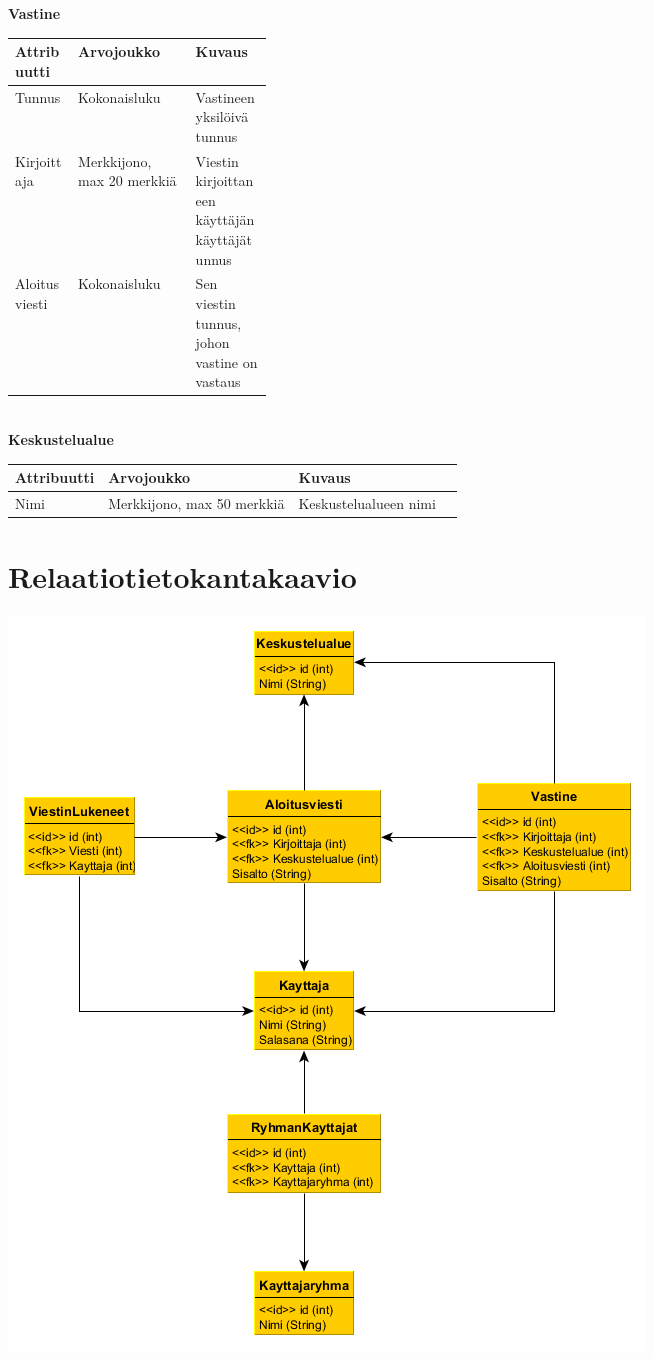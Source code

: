 \documentclass[12pt,a4paper,leqno]{report}
\begin{document}
\noindent \textbf{Vastine}

\begin{center}
\begin{tabular}{| l | l |m{0.3\linewidth}|}
\hline
\textbf{Attribuutti} & \textbf{Arvojoukko} & \textbf{Kuvaus} \\ \hline
Tunnus & Kokonaisluku & Vastineen yksilöivä tunnus \\ \hline
Kirjoittaja & Merkkijono, max 20 merkkiä & Viestin kirjoittaneen käyttäjän käyttäjätunnus \\ \hline
Aloitusviesti & Kokonaisluku & Sen viestin tunnus, johon vastine on vastaus \\ \hline
\end{tabular}
\end{center}
\ \\

\noindent \textbf{Keskustelualue}

\begin{center}
\begin{tabular}{| l | l | l | l |}
\hline
\textbf{Attribuutti} & \textbf{Arvojoukko} & \textbf{Kuvaus} \\ \hline
Nimi & Merkkijono, max 50 merkkiä & Keskustelualueen nimi \\ \hline
\end{tabular}
\end{center}

\chapter{Relaatiotietokantakaavio}

\begin{center}
\includegraphics[scale=0.50]{relaatiotietokantakaavio}
\end{center}
\end{document}
